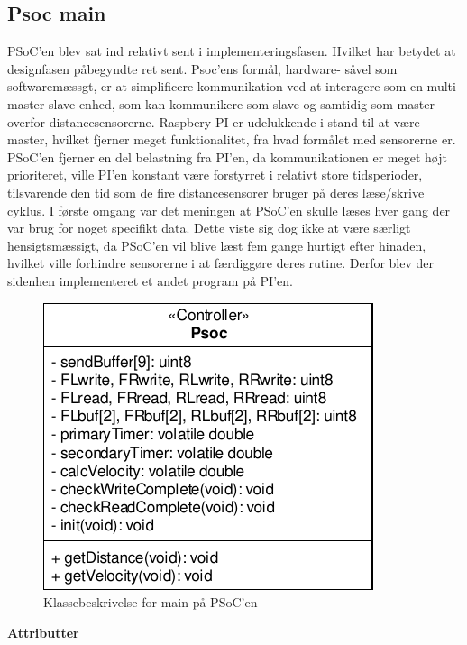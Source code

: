 \subsection{Psoc main} \label{sub:psoc_main}

PSoC'en blev sat ind relativt sent i implementeringsfasen. Hvilket har betydet at designfasen påbegyndte ret sent.
Psoc'ens formål, hardware- såvel som softwaremæssgt, er at simplificere \IIC kommunikation ved at interagere som en multi-master-slave enhed, som kan kommunikere som \IIC slave og samtidig som \IIC master overfor distancesensorerne. Raspbery PI er udelukkende i stand til at være master, hvilket fjerner meget funktionalitet, fra hvad formålet med sensorerne er. PSoC'en fjerner en del belastning fra PI'en, da \IIC kommunikationen er meget højt prioriteret, ville PI'en konstant være forstyrret i relativt store tidsperioder, tilsvarende den tid som de fire distancesensorer bruger på deres læse/skrive cyklus. I første omgang var det meningen at PSoC'en skulle læses hver gang der var brug for noget specifikt data. Dette viste sig dog ikke at være særligt hensigtsmæssigt, da PSoC'en vil blive læst fem gange hurtigt efter hinaden, hvilket ville forhindre sensorerne i at færdiggøre deres rutine. Derfor blev der sidenhen implementeret et andet program på PI'en. 

\begin{figure}[h]
\centering
\includegraphics[]{../fig/diagrammer/psoc/cd_psoc.pdf}
\caption{Klassebeskrivelse for main på PSoC'en}
\label{fig:cd_main_psoc}
\end{figure}

\clearpage

\textbf{Attributter}

